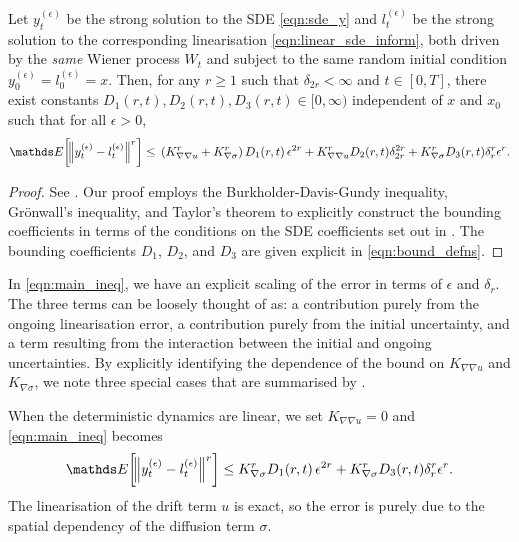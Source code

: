 \begin{theorem}\label{thm:main}
	Let \(y_t^{(\epsilon)}\) be the strong solution to the SDE \eqref{eqn:sde_y} and \(l_t^{(\epsilon)}\) be the strong solution to the corresponding linearisation \eqref{eqn:linear_sde_inform}, both driven by the \emph{same} Wiener process \(W_t\) and subject to the same random initial condition \(y_0^{(\epsilon)} = l_0^{(\epsilon)} = x\).
	Then, for any \(r \geq 1\) such that \(\delta_{2r} < \infty\) and \(t \in [0,T]\), there exist constants \( D_1(r,t), D_2(r,t), D_3(r,t) \in [0, \infty) \) independent of \(x\) and \(x_0\) such that for all \(\epsilon > 0\),
	\begin{equation}
		\avg{\norm{y_t^{(\epsilon)} - l_t^{(\epsilon)}}^r} \leq \begin{multlined}[t]
			\left(K_{\nabla\nabla u}^r + K_{\nabla\sigma}^r\right) D_1(r,t)\, \epsilon^{2r} + K_{\nabla\nabla u}^r D_2(r,t)\delta_{2r}^{2r}
			+ K_{\nabla\sigma}^r D_3(r,t)\delta_r^r \epsilon^r.
		\end{multlined}
		\label{eqn:main_ineq}
	\end{equation}
\end{theorem}
\begin{proof}
	See .
	Our proof employs the Burkholder-Davis-Gundy inequality, Gr\"onwall's inequality, and Taylor's theorem to explicitly construct the bounding coefficients in terms of the conditions on the SDE coefficients set out in .
	The bounding coefficients \(D_1\), \(D_2\), and \(D_3\) are given explicit in \eqref{eqn:bound_defns}.
\end{proof}
In \eqref{eqn:main_ineq}, we have an explicit scaling of the error in terms of \(\epsilon\) and \(\delta_r\).
The three terms can be loosely thought of as: a contribution purely from the ongoing linearisation error, a contribution purely from the initial uncertainty, and a term resulting from the interaction between the initial and ongoing uncertainties.
By explicitly identifying the dependence of the bound on \(K_{\nabla\nabla u}\) and \(K_{\nabla \sigma}\), we note three special cases that are summarised by .

\begin{remark}\label{rem:bound_linear}
	When the deterministic dynamics are linear, we set \(K_{\nabla\nabla u} = 0\) and \eqref{eqn:main_ineq} becomes
	\[
		\avg{\norm{y_t^{(\epsilon)} - l_t^{(\epsilon)}}^r} \leq   K_{\nabla\sigma}^r D_1(r,t)\, \epsilon^{2r} + K_{\nabla\sigma}^r D_3(r,t)\delta_r^r \epsilon^r.
	\]
	The linearisation of the drift term \(u\) is exact, so the error is purely due to the spatial dependency of the diffusion term \(\sigma\).
\end{remark}


